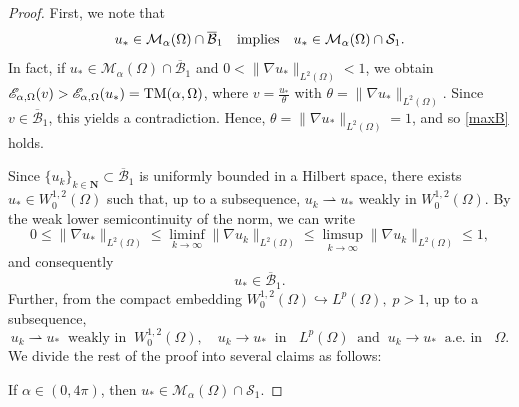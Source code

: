 \documentclass[reqno,11pt]{amsart}
\theoremstyle{definition}
\begin{document}
	\begin{proof} First, we note that 
    \begin{equation}\label{maxB}
         u_*\in \mathcal{M}_\alpha(\Omega)\cap \overline{\mathcal{B}}_1\quad {\rm implies} 
         \quad u_*\in\mathcal{M}_\alpha(\Omega)\cap\mathcal{S}_1.
    \end{equation}
    In fact, if $u_*\in \mathcal{M}_\alpha(\Omega)\cap \overline{\mathcal{B}}_1$ and 
    $0<\|\nabla u_*\|_{L^2(\Omega)}<1$, we obtain $\mathscr{E}_{\alpha,\Omega}(v)>
    \mathscr{E}_{\alpha,\Omega}(u_*)={\rm TM}(\alpha,\Omega)$, where $v =\tfrac{u_*}{\theta}$ 
    with $\theta=\|\nabla u_*\|_{L^2(\Omega)}$. Since $v\in\overline{\mathcal{B}}_1$, this 
    yields a contradiction. Hence, $\theta=\|\nabla u_*\|_{L^2(\Omega)}=1$, and so \eqref{maxB} holds.

Since $\{u_k\}_{k\in\mathbf{N}} \subset \overline{\mathcal{B}}_1$ is uniformly bounded in a Hilbert space, 
there exists $u_*\in W^{1,2}_0(\Omega)$ such that, up to a subsequence, $u_k \rightharpoonup u_*$ weakly 
in $W^{1,2}_0(\Omega)$. By the weak lower semicontinuity of the norm, we can write 
 \begin{equation}\label{semi-continuity}
            0\leq\|\nabla u_*\|_{L^2(\Omega)}\leq \liminf_{k\to\infty} 
            \|\nabla u_k\|_{L^2(\Omega)}\leq \limsup_{k\to\infty} \|\nabla u_k\|_{L^2(\Omega)}\leq 1,
            \end{equation}
            and consequently 
        \begin{equation}\label{eq:u_*inball}
            u_*\in\overline{\mathcal{B}}_1 .
        \end{equation}    
Further, from the compact embedding $W^{1,2}_0(\Omega)\hookrightarrow L^p(\Omega),\; p>1$, up to a subsequence, 
\begin{equation}\label{Lp-pointwise-convergence}
  u_k \rightharpoonup u_*\;\;\mbox{weakly in}\;\; W^{1,2}_0(\Omega),\quad u_k\to u_*\;\; 
  \mbox{in }\;\; L^p(\Omega)\;\; \mbox{and}\;\; u_k\to u_*\;\; \mbox{a.e.\ in }\;\;\Omega.
 \end{equation}
        We divide the rest of the proof into several claims as follows:

         If $\alpha\in(0,4\pi)$, then $u_*\in \mathcal{M}_\alpha(\Omega)
        \cap \mathcal{S}_1$.
        

\end{proof}
\end{document}
